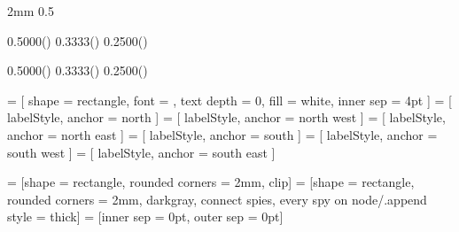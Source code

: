 
\usepackage{calc}
\usepackage{tikz}
\usetikzlibrary{calc,positioning,spy,shapes}



\newlength{\pfull}  \setlength{\pfull}  {2mm}
\newlength{\phalf}  \setlength{\phalf}  {0.5\pfull}

\newlength{\lwffp}   \setlength{\lwffp}   {0.5000\dimexpr(\pfull)}
\newlength{\lwfffp}  \setlength{\lwfffp}  {0.3333\dimexpr(\pfull)}
\newlength{\lwffffp} \setlength{\lwffffp} {0.2500\dimexpr(\pfull)}
\newlength{\lwfffffp}\setlength{\lwfffffp}{0.2000\dimexpr(\linewidth-4.0\pfull)}

\newlength{\twffp}   \setlength{\twffp}   {0.5000\dimexpr(\pfull)}
\newlength{\twfffp}  \setlength{\twfffp}  {0.3333\dimexpr(\pfull)}
\newlength{\twffffp} \setlength{\twffffp} {0.2500\dimexpr(\pfull)}
\newlength{\twfffffp}\setlength{\twfffffp}{0.2000\dimexpr(\textwidth-4.0\pfull)}

 = [ shape = rectangle, font = \scriptsize, text depth = 0, fill = white, inner sep = 4pt ]
  = [ labelStyle, anchor = north ]
 = [ labelStyle, anchor = north west ]
 = [ labelStyle, anchor = north east ]
  = [ labelStyle, anchor = south ]
 = [ labelStyle, anchor = south west ]
 = [ labelStyle, anchor = south east ]

 = [shape = rectangle, rounded corners = 2mm, clip] %
 = [shape = rectangle, rounded corners = 2mm, %
    darkgray, connect spies, every spy on node/.append style = {thick}] %
 = [inner sep = 0pt, outer sep = 0pt] %
